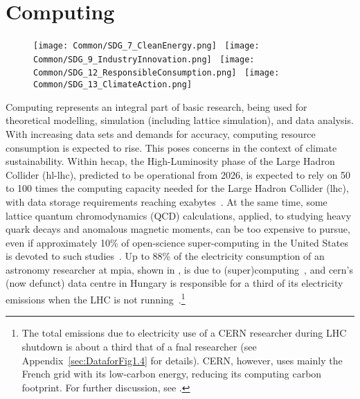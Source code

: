 \documentclass[../SustainableHEP.tex]{subfiles}
\begin{document}
\RaggedRight
\sloppy
\newpage


\section{Computing}
\label{sec:Computing}


\begin{figure}
\texttt{[image: Common/SDG\_7\_CleanEnergy.png]}~%
\texttt{[image: Common/SDG\_9\_IndustryInnovation.png]}~%
\texttt{[image: Common/SDG\_12\_ResponsibleConsumption.png]}~%
\texttt{[image: Common/SDG\_13\_ClimateAction.png]}
\end{figure}


\exSum

\noindent Computing represents an integral part of basic research, being used for theoretical modelling, simulation (including lattice simulation), and data analysis. With increasing data sets and demands for accuracy, computing resource consumption is expected to rise. 
This poses concerns in the context of climate sustainability. 
Within \acrshort{hecap}, \eg the High-Luminosity phase of the Large Hadron Collider (\acrshort{hl-lhc}), predicted to be operational from 2026, is expected to rely on 50 to 100 times the computing capacity needed for the Large Hadron Collider (\acrshort{lhc}), with data storage requirements reaching exabytes~\cite{CERN_computing_webpage}. 
At the same time, some lattice quantum chromodynamics (QCD) calculations, applied, \eg to studying heavy quark decays and anomalous magnetic moments, can be too expensive to pursue, even if approximately 10\% of open-science super-computing in the United States is devoted to such studies~\cite{Shanahan}.
Up to 88\% of the electricity consumption of an astronomy researcher at \acrshort{mpia}, shown in , is due to (super)computing~\cite{Jahnke2020}, and \acrshort{cern}'s (now defunct) data centre in Hungary is responsible for a third of its electricity emissions when the LHC is not running~\cite{Environment:2737239}.\footnote{The total emissions due to electricity use of a CERN researcher during LHC shutdown is about a third that of a \acrshort{fnal} researcher (see Appendix~\ref{sec:DataforFig1.4} for details). CERN, however, uses mainly the French grid with its low-carbon energy, reducing its computing carbon footprint. For further discussion, see .}
\end{document}
